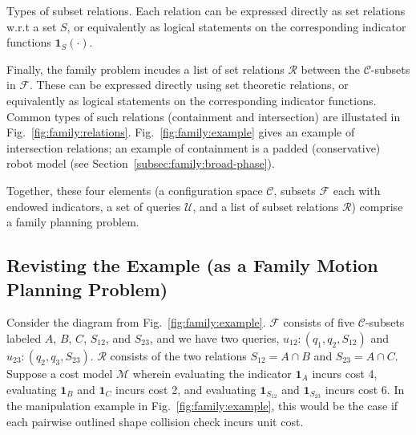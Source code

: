 \begin{marginfigure}
   \centering
   \vspace{-0.05in}
   \vspace{0.1in}
   \caption{Types of subset relations.
     Each relation can be expressed directly as set relations
     w.r.t a set $S$,
     or equivalently as logical statements
     on the corresponding indicator functions
     $\mathbf{1}_S(\cdot)$.}
   \label{fig:family:relations}
\end{marginfigure}

Finally, the family problem incudes a list of set relations
$\mathcal{R}$
between the $\mathcal{C}$-subsets in $\mathcal{F}$.
These can be expressed directly using set theoretic relations,
or equivalently as logical statements
on the corresponding indicator functions.
Common types of such relations
(containment and intersection)
are illustated in Fig.~\ref{fig:family:relations}.
Fig.~\ref{fig:family:example} gives an example of intersection relations;
an example of containment is a padded (conservative)
robot model (see Section~\ref{subsec:family:broad-phase}).

Together, these four elements
(a configuration space $\mathcal{C}$,
subsets $\mathcal{F}$ each with endowed indicators,
a set of queries $\mathcal{U}$,
and a list of subset relations $\mathcal{R}$)
comprise a family planning problem.

\subsection{Revisting the Example (as a Family Motion Planning Problem)}

Consider the diagram from Fig.~\ref{fig:family:example}.
$\mathcal{F}$ consists of five $\mathcal{C}$-subsets labeled
$A$, $B$, $C$, $S_{12}$, and $S_{23}$,
and we have two queries,
$u_{12}: (q_1, q_2, S_{12})$
and
$u_{23}: (q_2, q_3, S_{23})$.
$\mathcal{R}$ consists of the two relations
$S_{12} = A \cap B$ and $S_{23} = A \cap C$.
Suppose a cost model $\mathcal{M}$
wherein evaluating the indicator
$\mathbf{1}_A$ incurs cost 4,
evaluating $\mathbf{1}_B$ and $\mathbf{1}_C$ incurs cost 2,
and evaluating $\mathbf{1}_{S_{12}}$ and $\mathbf{1}_{S_{23}}$
incurs cost 6.
In the manipulation example in
Fig.~\ref{fig:family:example},
this would be the case if each
pairwise outlined shape collision check incurs unit cost.

